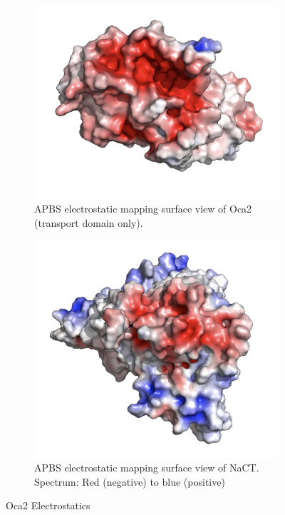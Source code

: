 \begin{figure}[htb]
    \centering %
\begin{subfigure}{0.4\textwidth}
  \includegraphics[width=\linewidth]{oca2/oca2_6a.png}
  \caption{APBS electrostatic mapping surface view of Oca2 (transport domain only).}
  \label{fig:oca2_6a}
\end{subfigure}\hfil %
\begin{subfigure}{0.4\textwidth}
  \includegraphics[width=\linewidth]{oca2/oca2_6b.png}
  \caption{APBS electrostatic mapping surface view of NaCT. Spectrum: Red (negative) to blue (positive)}
  \label{fig:oca2_6b}
\end{subfigure}
\caption{Oca2 Electrostatics}
\small

\label{figure:oca2_6}
\end{figure}




